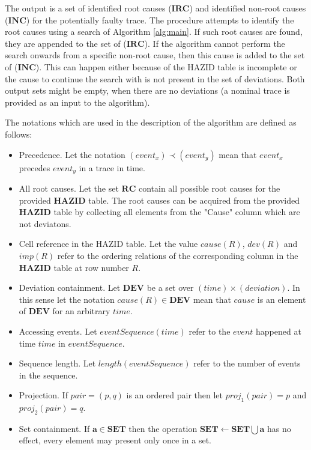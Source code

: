 \documentclass[conference]{IEEEtran}
\begin{document}
The output is a set of identified root causes ($\mathbf{IRC}$) and identified non-root causes ($\mathbf{INC}$) for the potentially faulty trace. The procedure attempts to identify the root causes using a search of Algorithm \ref{alg:main}. If such root causes are found, they are appended to the set of ($\mathbf{IRC}$). If the algorithm cannot perform the search onwards from a specific non-root cause, then this cause is added to the set of ($\mathbf{INC}$). This can happen either because of the HAZID table is incomplete or the cause to continue the search with is not present in the set of deviations. Both output sets might be empty, when there are no deviations (a nominal trace is provided as an input to the algorithm).

The notations which are used in the description of the algorithm are defined as follows:

\begin{itemize}
\item Precedence. Let the notation $(event_x) \prec (event_y)$ mean that $event_x$ precedes $event_y$ in a trace in time.
\item All root causes. Let the set $\mathbf{RC}$ contain all possible root causes for the provided $\mathbf{HAZID}$ table. The root causes can be acquired from the provided $\mathbf{HAZID}$ table by collecting all elements from the "Cause" column which are not deviatons.
\item Cell reference in the HAZID table. Let the value $cause(R)$, $dev(R)$ and $imp(R)$ refer to the ordering relations of the corresponding column
in the $\mathbf{HAZID}$ table at row number $R$.
\item Deviation containment. Let $\mathbf{DEV}$ be a set over $(time)\times(deviation)$. In this sense let the notation $cause(R) \in \mathbf{DEV}$ mean that $cause$ is an element of $\mathbf{DEV}$ for an arbitrary $time$.
\item Accessing events. Let $eventSequence(time)$ refer to the $event$ happened at time $time$ in $eventSequence$.
\item Sequence length. Let $length(eventSequence)$ refer to the number of events in the sequence.
\item Projection. If $pair = (p,q)$ is an ordered pair then let $proj_1(pair)=p$ and $proj_2(pair)=q$.
\item Set containment. If $\mathbf{a} \in \mathbf{SET}$ then the operation $\mathbf{SET} \leftarrow \mathbf{SET} \bigcup \mathbf{a}$ has no effect, every element may present only once in a set.
\end{itemize}
\end{document}
